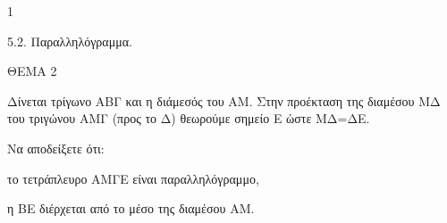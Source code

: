 \begin{ylh}{1}
    \item 5.2. Παραλληλόγραμμα.
\end{ylh}

ΘΕΜΑ 2

Δίνεται τρίγωνο ΑΒΓ και η διάμεσός του ΑΜ. Στην προέκταση της διαμέσου ΜΔ του τριγώνου ΑΜΓ (προς το Δ) θεωρούμε σημείο Ε ώστε ΜΔ=ΔΕ.

Να αποδείξετε ότι:

\begin{alist}
\item το τετράπλευρο ΑΜΓΕ είναι παραλληλόγραμμο, 

\item η ΒΕ διέρχεται από το μέσο της διαμέσου ΑΜ. 
\end{alist}

